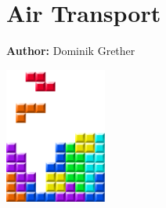 \chapter{Air Transport}
\label{ch:air}

\hfill \textbf{Author:} Dominik Grether

\begin{center} \includegraphics[width=0.25\textwidth, angle=0]{figures/MATSimBook.png} \end{center}










